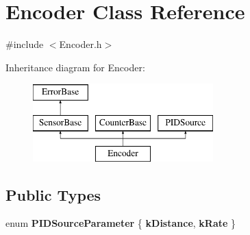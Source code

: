 \hypertarget{classEncoder}{
\section{Encoder Class Reference}
\label{classEncoder}
}


{\ttfamily \#include $<$Encoder.h$>$}

Inheritance diagram for Encoder:\begin{figure}[H]
\begin{center}
\leavevmode
\includegraphics[height=3.000000cm]{classEncoder}
\end{center}
\end{figure}
\subsection*{Public Types}
\begin{DoxyCompactItemize}
\item 
enum {\bfseries PIDSourceParameter} \{ {\bfseries kDistance}, 
{\bfseries kRate}
 \}
\end{DoxyCompactItemize}
